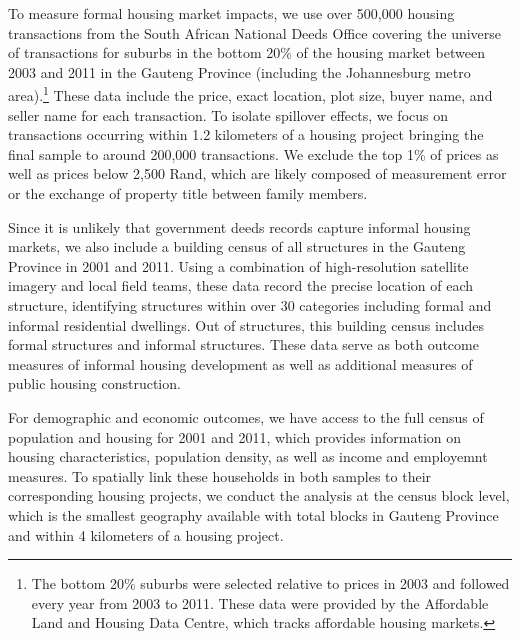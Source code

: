 \documentclass[12pt]{article}
\begin{document}
To measure formal housing market impacts, we use over 500,000 housing transactions from the South African National Deeds Office covering the universe of transactions for suburbs in the bottom 20\% of the housing market between 2003 and 2011 in the Gauteng Province (including the Johannesburg metro area).\footnote{The bottom 20\% suburbs were selected relative to prices in 2003 and followed every year from 2003 to 2011.  These data were provided by the Affordable Land and Housing Data Centre, which tracks affordable housing markets.}  These data include the price, exact location, plot size, buyer name, and seller name for each transaction.  To isolate spillover effects, we focus on transactions occurring within 1.2 kilometers of a housing project bringing the final sample to around 200,000 transactions.  We exclude the top 1\% of prices as well as prices below 2,500 Rand, which are likely composed of measurement error or the exchange of property title between family members.

Since it is unlikely that government deeds records capture informal housing markets, we also include a building census of all structures in the Gauteng Province in 2001 and 2011.  Using a combination of high-resolution satellite imagery and local field teams, these data record the precise location of each structure, identifying structures within over 30 categories including formal and informal residential dwellings.  Out of structures, this building census includes formal structures and informal structures.  These data serve as both outcome measures of informal housing development as well as additional measures of public housing construction.

For demographic and economic outcomes, we have access to the full census of population and housing for 2001 and 2011, which provides information on housing characteristics, population density, as well as income and employemnt measures.   To spatially link these households in both samples to their corresponding housing projects, we conduct the analysis at the census block level, which is the smallest geography available with total blocks in Gauteng Province and within 4 kilometers of a housing project.

\end{document}
